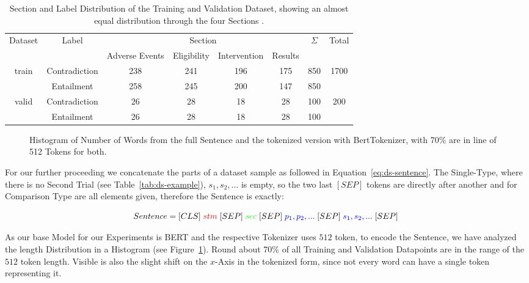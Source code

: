 \begin{table}[t]
    \centering
    \caption{Section and Label Distribution of the Training and Validation Dataset, showing
             an almost equal distribution through the four Sections \cite{noauthor_nli4ct_nodate-1}.}
    \label{tab:ds-distribution}
    \begin{tabular}{|c|c||cccc|c|c|}
    \hline
    \multirow{2}{*}{Dataset} & \multirow{2}{*}{Label} & \multicolumn{4}{c|}{Section} & \multirow{2}{*}{$\Sigma$} & \multirow{2}{*}{Total} \\
                           &               & Adverse Events & Eligibility & Intervention & Results &     &                       \\ \hline\hline
    \multirow{2}{*}{train} & Contradiction & 238            & 241         & 196          & 175     & 850 & \multirow{2}{*}{1700} \\
                           & Entailment    & 258            & 245         & 200          & 147     & 850 &                       \\ \hline
    \multirow{2}{*}{valid} & Contradiction & 26             & 28          & 18           & 28      & 100 & \multirow{2}{*}{200}  \\
                           & Entailment    & 26             & 28          & 18           & 28      & 100 &                       \\ \hline
    \end{tabular}
\end{table}


\begin{figure}[!b]
    \centering
    
    \caption{Histogram of Number of Words from the full Sentence and the tokenized version with BertTokenizer, 
             with 70\% are in line of 512 Tokens for both.}\label{cap:hist}
\end{figure}

For our further proceeding we concatenate the parts of a dataset sample as followed in Equation~\ref{eq:ds-sentence}.
The Single-Type, where there is no Second Trial (see Table~\ref{tab:ds-example}), $s_1, s_2, ... $
is empty, so the two last $[SEP]$ tokens are directly after another and for Comparison Type are all elements given, 
therefore the Sentence is exactly:

\begin{equation}\label{eq:ds-sentence}
\resizebox{0.91\hsize}{!}{%
 $Sentence = [CLS] \; \textcolor{red}{stm}\;
             [SEP] \; \textcolor{green}{sec}\;
             [SEP] \; \textcolor{blue}{p_1, p_2, ... }\;
             [SEP] \; \textcolor{blue}{s_1, s_2, ... }\;
             [SEP]$      
}
\end{equation}

As our base Model for our Experiments is BERT and the respective Tokenizer uses $512$ token, to encode the Sentence, 
we have analyzed the length Distribution in a Histogram (see Figure~\ref{cap:hist}). 
Round about 70\% of all Training and Validation Datapoints are in the range of the $512$ token length. 
Visible is also the slight shift on the $x$-Axis in the tokenized form, since not every word can have a single token
representing it.